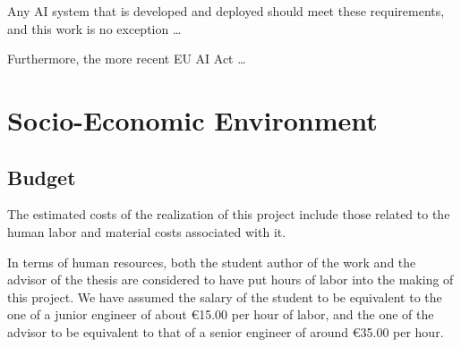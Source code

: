 \documentclass[../main.tex]{subfiles}
\begin{document}
Any AI system that is developed and deployed should meet these requirements, and this work is no exception \dots

Furthermore, the more recent EU AI Act \cite{eu_aiact_2023}\dots



\chapter*{Socio-Economic Environment} \label{chap:socioeconomic}



\section*{Budget} \label{budget}
\vspace*{-0.05cm}

The estimated costs of the realization of this project include those related to the human labor and material costs associated with it.

In terms of human resources, both the student author of the work and the advisor of the thesis are considered to have put hours of labor into the making of this project. We have assumed the salary of the student to be equivalent to the one of a junior engineer of about €15.00 per hour of labor, and the one of the advisor to be equivalent to that of a senior engineer of around €35.00 per hour. 
\end{document}
